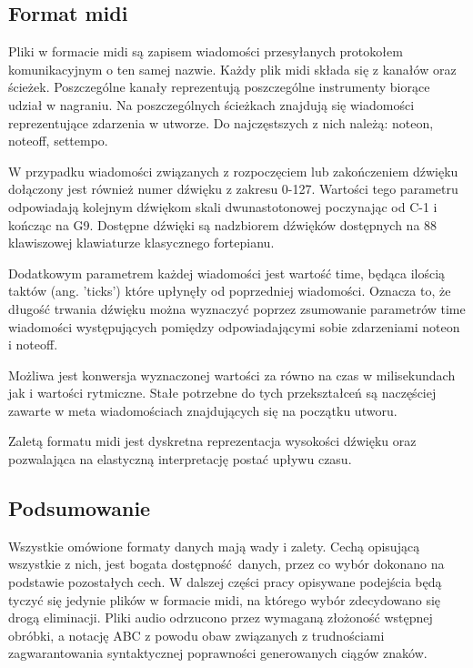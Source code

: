 {{        \subsection{Format midi}
        {
            Pliki w formacie midi są zapisem wiadomości przesyłanych protokołem komunikacyjnym o ten samej nazwie.
            Każdy plik midi składa się z kanałów oraz ścieżek. Poszczególne kanały reprezentują poszczególne instrumenty
            biorące udział w nagraniu. Na poszczególnych ścieżkach znajdują się wiadomości reprezentujące zdarzenia w utworze.
            Do najczęstszych z nich należą: note\textunderscore on, note\textunderscore off, set\textunderscore tempo.

            W przypadku wiadomości związanych z rozpoczęciem lub zakończeniem
            dźwięku dołączony jest również numer dźwięku z zakresu 0-127. 
            Wartości tego parametru odpowiadają kolejnym dźwiękom skali dwunastotonowej poczynając od C-1 i kończąc na G9.
            Dostępne dźwięki są nadzbiorem dźwięków dostępnych na 88 klawiszowej klawiaturze klasycznego fortepianu.

            Dodatkowym parametrem każdej wiadomości jest wartość time, będąca ilością taktów (ang. 'ticks') które upłynęły
            od poprzedniej wiadomości. Oznacza to, że długość trwania dźwięku można wyznaczyć poprzez zsumowanie parametrów time
            wiadomości występujących pomiędzy odpowiadającymi sobie zdarzeniami note\textunderscore on i note\textunderscore off.

            Możliwa jest konwersja wyznaczonej wartości za równo na czas w milisekundach jak i wartości rytmiczne.
            Stałe potrzebne do tych przekształceń są naczęściej zawarte w meta wiadomościach znajdujących się na początku utworu.

            Zaletą formatu midi jest dyskretna reprezentacja wysokości dźwięku oraz pozwalająca na elastyczną 
            interpretację postać upływu czasu.
        }

        \subsection{Podsumowanie}
        {
            Wszystkie omówione formaty danych mają wady i zalety. Cechą opisującą wszystkie z nich, jest 
            bogata dostępność danych, przez co wybór dokonano na podstawie pozostałych cech.
            W dalszej części pracy opisywane podejścia będą tyczyć się jedynie plików w formacie midi, na którego 
            wybór zdecydowano się drogą eliminacji. Pliki audio odrzucono przez wymaganą złożoność wstępnej obróbki,
            a notację ABC z powodu obaw związanych z trudnościami zagwarantowania syntaktycznej poprawności 
            generowanych ciągów znaków.
        }
    }

}
